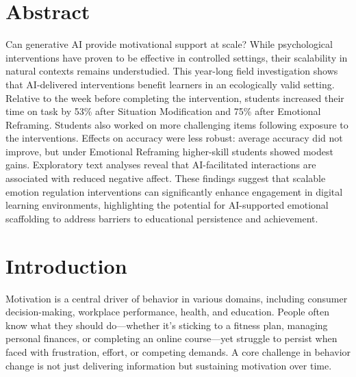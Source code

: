 \documentclass[11pt]{report}
\begin{document}
\begin{mainf}
\section{Abstract}
Can generative AI provide motivational support at scale? 
While psychological interventions have proven to be effective in controlled settings, their scalability in natural contexts remains understudied. 
This year-long field investigation shows that AI-delivered interventions benefit learners in an ecologically valid setting.
Relative to the week before completing the intervention, students increased their time on task by 53\% after Situation Modification and 75\% after Emotional Reframing. 
Students also worked on more challenging items following exposure to the interventions.
Effects on accuracy were less robust: average accuracy did not improve, but under Emotional Reframing higher-skill students showed modest gains.
Exploratory text analyses reveal that AI-facilitated interactions are associated with reduced negative affect.
These findings suggest that scalable emotion regulation interventions can significantly enhance engagement in digital learning environments, highlighting the potential for AI-supported emotional scaffolding to address barriers to educational persistence and achievement.

\section{Introduction}
Motivation is a central driver of behavior in various domains, including consumer decision-making, workplace performance, health, and education. 
People often know what they should do---whether it’s sticking to a fitness plan, managing personal finances, or completing an online course---yet struggle to persist when faced with frustration, effort, or competing demands. 
A core challenge in behavior change is not just delivering information but sustaining motivation over time.



\end{mainf}
\end{document}
